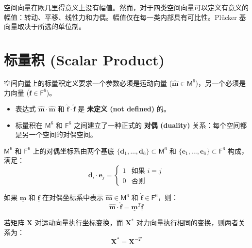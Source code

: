 空间向量在欧几里得意义上没有幅值。然而，对于四类空间向量可以定义有意义的幅值：转动、平移、线性力和力偶。幅值仅在每一类内部具有可比性。Plücker 基向量取决于所选的单位制。

\section{标量积 (Scalar Product)}

空间向量上的标量积定义要求一个参数必须是运动向量 ($\hat{\bm{m}} \in \mathsf{M}^6$)，另一个必须是力向量 ($\hat{\bm{f}} \in \mathsf{F}^6$)。
\begin{itemize}
    \item 表达式 $\hat{\bm{m}} \cdot \hat{\bm{m}}$ 和 $\hat{\bm{f}} \cdot \hat{\bm{f}}$ 是 \textbf{未定义 (not defined)} 的。
    \item 标量积在 $\mathsf{M}^6$ 和 $\mathsf{F}^6$ 之间建立了一种正式的 \textbf{对偶 (duality)} 关系：每个空间都是另一个空间的对偶空间。
\end{itemize}

$\mathsf{M}^6$ 和 $\mathsf{F}^6$ 上的对偶坐标系由两个基底 $\{\bm{d}_1, \dots, \bm{d}_6\} \subset \mathsf{M}^6$ 和 $\{\bm{e}_1, \dots, \bm{e}_6\} \subset \mathsf{F}^6$ 构成，满足：
\begin{equation}
\bm{d}_i \cdot \bm{e}_j = \begin{cases} 1 & \text{如果 } i = j \\ 0 & \text{否则} \end{cases}
\end{equation}

如果 $\underline{\bm{m}}$ 和 $\underline{\bm{f}}$ 在对偶坐标系中表示 $\hat{\bm{m}} \in \mathsf{M}^6$ 和 $\hat{\bm{f}} \in \mathsf{F}^6$，则：
\begin{equation}
\hat{\bm{m}} \cdot \hat{\bm{f}} = \underline{\bm{m}}^T \underline{\bm{f}}
\end{equation}

若矩阵 $\bm{X}$ 对运动向量执行坐标变换，而 $\bm{X}^*$ 对力向量执行相同的变换，则两者关系为：
\begin{equation}
\bm{X}^* = \bm{X}^{-T}
\end{equation}